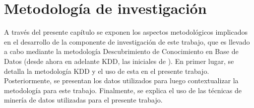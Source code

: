 
\chapter{Metodología de investigación}
\label{chp:metodologia}
A través del presente capítulo se exponen los aspectos metodológicos implicados en el desarrollo de la componente de investigación de este trabajo, que es llevado a cabo mediante la metodología Descubrimiento de Conocimiento en Base de Datos (desde ahora en adelante KDD, las iniciales de ). En primer lugar, se detalla la metodología KDD y el uso de esta en el presente trabajo. Posteriormente, se presentan los datos utilizados para luego contextualizar la metodología para este trabajo. Finalmente, se explica el uso de las técnicas de minería de datos utilizadas para el presente trabajo.







%